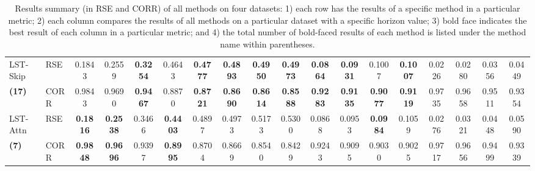 \documentclass[sigconf]{acmart}
\begin{document}
\begin{table*}[!ht]
{\begin{tabular}{ll|cccc|cccc|cccc|cccc}
\midrule                                        
\midrule
\multirow{1}{*}{LST-Skip}	& RSE 
							  & 0.1843 & 0.2559 & \textbf{0.3254} & 0.4643
							  & \textbf{0.4777} & \textbf{0.4893} & \textbf{0.4950} & \textbf{0.4973}
                			  & \textbf{0.0864} & \textbf{0.0931} & 0.1007 & \textbf{0.1007}
							  & 0.0226 & 0.0280 & 0.0356 & 0.0449\\
\textbf{(17)}               & CORR 
                       		  & 0.9843 & 0.9690 & \textbf{0.9467} & 0.8870 
                              & \textbf{0.8721} & \textbf{0.8690} & \textbf{0.8614} & \textbf{0.8588}
                              & \textbf{0.9283} & \textbf{0.9135} & \textbf{0.9077} & \textbf{0.9119}
                              & 0.9735 & 0.9658 & 0.9511 & 0.9354\\ 
                              
\midrule                                                
\multirow{1}{*}{LST-Attn}	& RSE 
							  & \textbf{0.1816} & \textbf{0.2538} & 0.3466 & \textbf{0.4403}
							  & 0.4897 & 0.4973 & 0.5173 & 0.5300
                			  & 0.0868 & 0.0953 & \textbf{0.0984} & 0.1059
							  & 0.0276 & 0.0321 & 0.0448 & 0.0590 \\
\textbf{(7)}               & CORR 
                       		  & \textbf{0.9848} & \textbf{0.9696} & 0.9397 & \textbf{0.8995} 
                              & 0.8704 & 0.8669 & 0.8540 & 0.8429
                              & 0.9243 & 0.9095 & 0.9030 & 0.9025
                              & 0.9717 & 0.9656 & 0.9499 & 0.9339 \\ 
                                                
\bottomrule
\end{tabular}
}
\caption{Results summary (in RSE and CORR) of all methods on four datasets: 1) each row has the results of a specific method in a particular metric; 2) each column compares the results of all methods on a particular dataset with a specific horizon value; 3) bold face indicates the best result of each column in a particular metric; and 4) the total number of bold-faced results of each method is listed under the method name within parentheses. }
\label{tb:result}
\end{table*}

 
\end{document}
